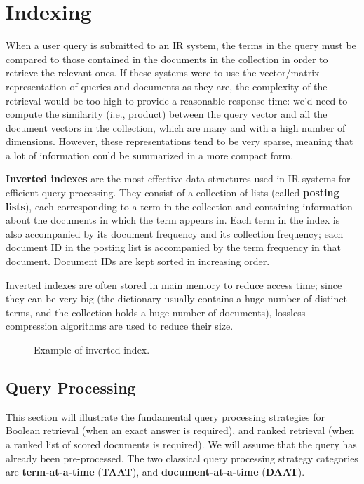 \chapter{Indexing}

When a user query is submitted to an IR system, the terms in the query must be compared to those contained in the documents in the collection in order to retrieve the relevant ones. If these systems were to use the vector/matrix representation of queries and documents as they are, the complexity of the retrieval would be too high to provide a reasonable response time: we'd need to compute the similarity (i.e., product) between the query vector and all the document vectors in the collection, which are many and with a high number of dimensions. However, these representations tend to be very sparse, meaning that a lot of information could be summarized in a more compact form.

\textbf{Inverted indexes} are the most effective data structures used in IR systems for efficient query processing. They consist of a collection of lists (called \textbf{posting lists}), each corresponding to a term in the collection and containing information about the documents in which the term appears in. Each term in the index is also accompanied by its document frequency and its collection frequency; each document ID in the posting list is accompanied by the term frequency in that document. Document IDs are kept sorted in increasing order.

Inverted indexes are often stored in main memory to reduce access time; since they can be very big (the dictionary usually contains a huge number of distinct terms, and the collection holds a huge number of documents), lossless compression algorithms are used to reduce their size.
\clearpage
\begin{figure}[!h]
    \centering
    
    \caption{Example of inverted index.}
    \label{fig:inverted-index}
\end{figure}

\section{Query Processing}

This section will illustrate the fundamental query processing strategies for Boolean retrieval (when an exact answer is required), and ranked retrieval (when a ranked list of scored documents is required). We will assume that the query has already been pre-processed. The two classical query processing strategy categories are \textbf{term-at-a-time} (\textbf{TAAT}), and \textbf{document-at-a-time} (\textbf{DAAT}).

